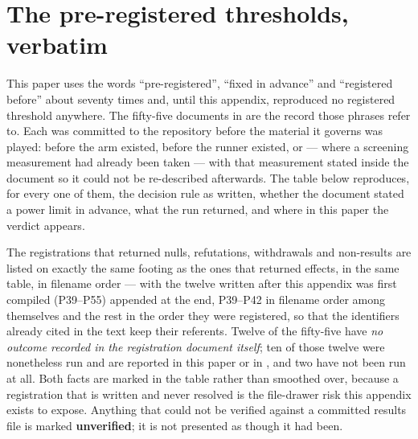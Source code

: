 %

\section{The pre-registered thresholds, verbatim}
\label{app:prereg}

This paper uses the words ``pre-registered'', ``fixed in advance'' and
``registered before'' about seventy times and, until this appendix, reproduced
no registered threshold anywhere. The fifty-five documents in 
are the record those phrases refer to. Each was committed to the repository
before the material it governs was played: before the arm existed, before the
runner existed, or --- where a screening measurement had already been taken ---
with that measurement stated inside the document so it could not be
re-described afterwards. The table below reproduces, for every one of them, the
decision rule as written, whether the document stated a power limit in advance,
what the run returned, and where in this paper the verdict appears.

The registrations that returned nulls, refutations, withdrawals and
non-results are listed on exactly the same footing as the ones that returned
effects, in the same table, in filename order --- with the twelve written after
this appendix was first compiled (P39--P55) appended at the end, P39--P42 in
filename order among themselves and the rest in the order they were
registered, so that the identifiers already cited in the text keep their
referents. Twelve of the fifty-five have \emph{no outcome recorded in the
registration document itself}; ten of those twelve were nonetheless run and are
reported in this paper or in , and two have not
been run at all. Both facts are
marked in the table rather than smoothed over, because a registration that is
written and never resolved is the file-drawer risk this appendix exists to
expose. Anything that could not be verified against a committed results file
is marked \textbf{unverified}; it is not presented as though it had been.

